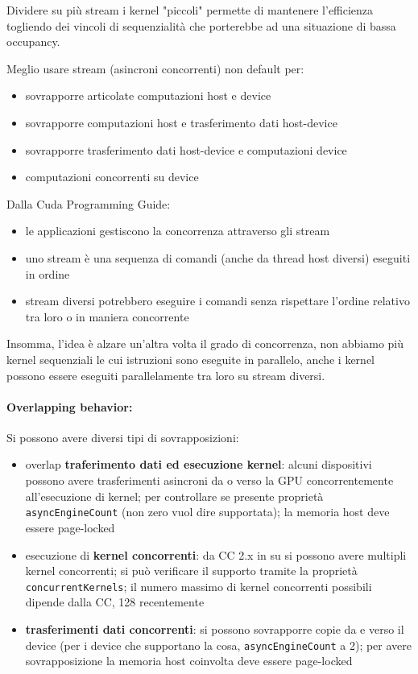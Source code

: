 Dividere su più stream i kernel "piccoli" permette di mantenere l'efficienza togliendo dei vincoli di sequenzialità che porterebbe ad una situazione di bassa occupancy.

Meglio usare stream (asincroni concorrenti) non default per:
\begin{itemize}
	\item sovrapporre articolate computazioni host e device
	
	\item sovrapporre computazioni host e trasferimento dati host-device
	
	\item sovrapporre trasferimento dati host-device e computazioni device
	
	\item computazioni concorrenti su device
\end{itemize}

Dalla Cuda Programming Guide:
\begin{itemize}
	\item le applicazioni gestiscono la concorrenza attraverso gli stream
	
	\item uno stream è una sequenza di comandi (anche da thread host diversi) eseguiti in ordine
	
	\item stream diversi potrebbero eseguire i comandi senza rispettare l'ordine relativo tra loro o in maniera concorrente
\end{itemize}

Insomma, l'idea è alzare un'altra volta il grado di concorrenza, non abbiamo più kernel sequenziali le cui istruzioni sono eseguite in parallelo, anche i kernel possono essere eseguiti parallelamente tra loro su stream diversi.

\paragraph{Overlapping behavior:} Si possono avere diversi tipi di sovrapposizioni: 
\begin{itemize}
	\item overlap \textbf{traferimento dati ed esecuzione kernel}: alcuni dispositivi possono avere trasferimenti asincroni da o verso la GPU concorrentemente all'esecuzione di kernel; per controllare se presente proprietà \texttt{asyncEngineCount} (non zero vuol dire supportata); la memoria host deve essere page-locked
	
	\item esecuzione di \textbf{kernel concorrenti}: da CC 2.x in su si possono avere multipli kernel concorrenti; si può verificare il supporto tramite la proprietà \texttt{concurrentKernels}; il numero massimo di kernel concorrenti possibili dipende dalla CC, 128 recentemente
	
	\item \textbf{trasferimenti dati concorrenti}: si possono sovrapporre copie da e verso il device (per i device che supportano la cosa, \texttt{asyncEngineCount} a 2); per avere sovrapposizione la memoria host coinvolta deve essere page-locked
\end{itemize}

